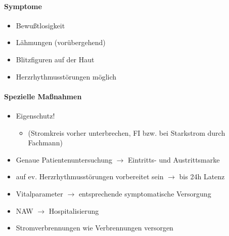 \paragraph{Symptome}

\begin{itemize}
    \item Bewu{\ss}tlosigkeit
    \item L\"ahmungen (vor\"ubergehend)
    \item Blitzfiguren auf der Haut
    \item Herzrhythmusst\"orungen m\"oglich
\end{itemize}


\begin{gMassnahmenEnv}
    \paragraph{Spezielle Ma{\ss}nahmen}
    \begin{itemize}
        \item Eigenschutz!
        \begin{itemize}
            \item (Stromkreis  vorher  unterbrechen, FI bzw. bei Starkstrom durch
            Fachmann)
        \end{itemize}
        \item Genaue  Patientenuntersuchung ${\rightarrow}$ Eintritts{}-  und
        Austrittsmarke
        \item auf ev. Herzrhythmusst\"orungen vorbereitet  sein ${\rightarrow}$
        bis 24h Latenz
        \item Vitalparameter ${\rightarrow}$ entsprechende  symptomatische
        Versorgung
        \item NAW ${\rightarrow}$ Hospitalisierung
        \item Stromverbrennungen wie Verbrennungen  versorgen
    \end{itemize}
\end{gMassnahmenEnv}



